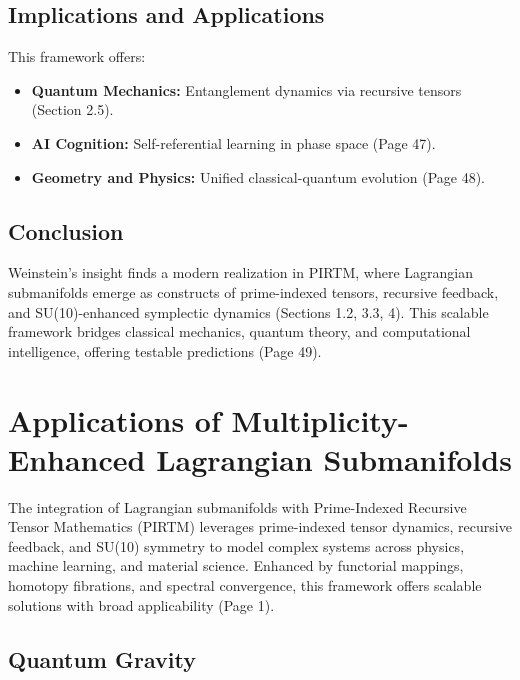 \documentclass{article}
\theoremstyle{plain}
\begin{document}
\subsection{Implications and Applications}
This framework offers:
\begin{itemize}
    \item \textbf{Quantum Mechanics:} Entanglement dynamics via recursive tensors (Section 2.5).
    \item \textbf{AI Cognition:} Self-referential learning in phase space (Page 47).
    \item \textbf{Geometry and Physics:} Unified classical-quantum evolution (Page 48).
\end{itemize}

\subsection{Conclusion}
Weinstein’s insight finds a modern realization in PIRTM, where Lagrangian submanifolds emerge as constructs of prime-indexed tensors, recursive feedback, and SU(10)-enhanced symplectic dynamics (Sections 1.2, 3.3, 4). This scalable framework bridges classical mechanics, quantum theory, and computational intelligence, offering testable predictions (Page 49).

\section{Applications of Multiplicity-Enhanced Lagrangian Submanifolds}

The integration of Lagrangian submanifolds with Prime-Indexed Recursive Tensor Mathematics (PIRTM) leverages prime-indexed tensor dynamics, recursive feedback, and SU(10) symmetry to model complex systems across physics, machine learning, and material science. Enhanced by functorial mappings, homotopy fibrations, and spectral convergence, this framework offers scalable solutions with broad applicability (Page 1).

\subsection{Quantum Gravity}
\end{document}
